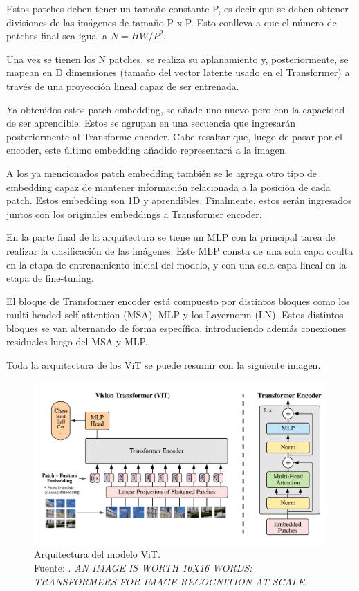Estos patches deben tener un tamaño constante P, es decir que se deben obtener divisiones de las imágenes de tamaño P x P. Esto conlleva a que el número de patches final sea igual a $N = HW / P^2$.

Una vez se tienen los N patches, se realiza su aplanamiento y, posteriormente, se mapean en D dimensiones (tamaño del vector latente usado en el Transformer) a través de una proyección lineal capaz de ser entrenada.

Ya obtenidos estos patch embedding, se añade uno nuevo pero con la capacidad de ser aprendible. Estos se agrupan en una secuencia que ingresarán posteriormente al Transforme encoder. Cabe resaltar que, luego de pasar por el encoder, este último embedding añadido representará a la imagen.

A los ya mencionados patch embedding también se le agrega otro tipo de embedding capaz de mantener información relacionada a la posición de cada patch. Estos embedding son 1D y aprendibles. Finalmente, estos serán ingresados juntos con los originales embeddings a Transformer encoder.

En la parte final de la arquitectura se tiene un MLP con la principal tarea de realizar la clasificación de las imágenes. Este MLP consta de una sola capa oculta en la etapa de entrenamiento inicial del modelo, y con una sola capa lineal en la etapa de fine-tuning.

El bloque de Transformer encoder está compuesto por distintos bloques como los multi headed self attention (MSA), MLP y los Layernorm (LN). Estos distintos bloques se van alternando de forma específica, introduciendo además conexiones residuales luego del MSA y MLP.

Toda la arquitectura de los ViT se puede resumir con la siguiente imagen.

\begin{figure}[H]
	\begin{center}
		\includegraphics[width=1.00\textwidth]{2/figures/vit_arquitecture.png}
		\caption[Arquitectura del modelo ViT]{Arquitectura del modelo ViT. \\
		Fuente: \cite{pr_dosovitskiy2021animageisworth}. \textit{AN IMAGE IS WORTH 16X16 WORDS: TRANSFORMERS FOR IMAGE RECOGNITION AT SCALE}.}
		\label{2:fig206}
	\end{center}
\end{figure}


